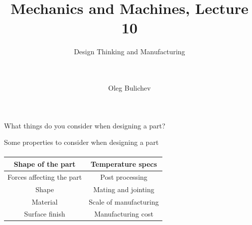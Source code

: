 \documentclass[aspectratio=169]{beamer}
\title[MaM]{Mechanics and Machines, Lecture 10} %
\subtitle{Design Thinking and Manufacturing  
\\ \   \\   
\ } %
\author{Oleg Bulichev}
\newcommand{\fbckg}[1]{\usebackgroundtemplate{\texttt{[image: \#1]}}}%
\begin{document}
\setlength{\abovedisplayskip}{0pt}
\setlength{\belowdisplayskip}{0pt}
\setlength{\abovedisplayshortskip}{0pt}
\setlength{\belowdisplayshortskip}{0pt}

\fbckg{fibeamer/figs/title_page.png}

\fbckg{fibeamer/figs/common.png}

\note{\scriptsize \begin{itemize}
        \item \
    \end{itemize}}

\begin{frame}[c]{}
    \framesubtitle{}
        \LARGE \centering
        What things do you consider when designing a part?
    \end{frame}

\begin{frame}[c]{Some properties to consider when designing a part}
\framesubtitle{}
\begin{table}[H]
    \LARGE
    \centering
    \begin{tabular}{|c|c|}
    \hline
        \textbf{Shape of the part} & \textbf{Temperature specs} \\ \hline
        Forces affecting the part & Post processing \\ 
        Shape & Mating and jointing \\ 
        Material & Scale of manufacturing \\ 
        Surface finish & Manufacturing cost \\ \hline
    \end{tabular}
\end{table}
\end{frame}
\end{document}
